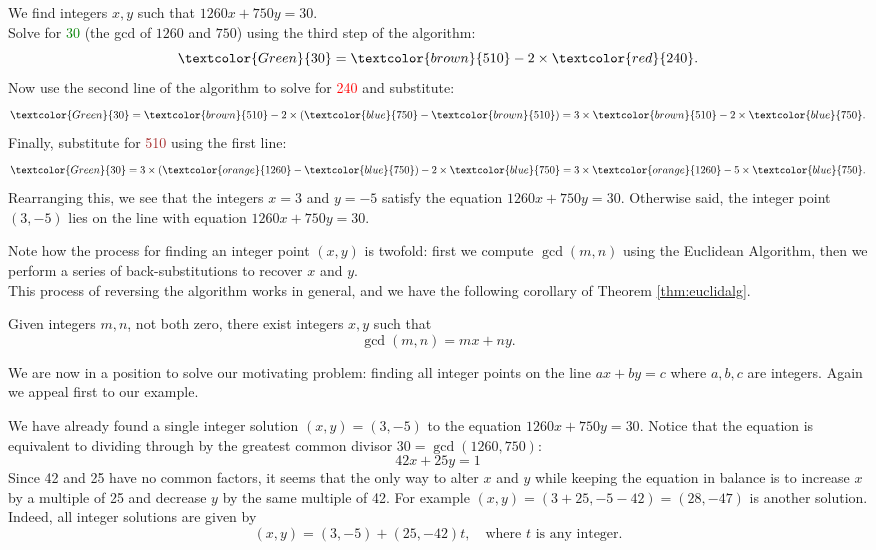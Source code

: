 \begin{example}[continued]
We find integers $x,y$ such that $1260x+750y=30$.\\[5pt]
Solve for \textcolor{Green}{30} (the gcd of $1260$ and $750$) using the third step of the algorithm:
\[\textcolor{Green}{30}=\textcolor{brown}{510}-2\times\textcolor{red}{240}.\]
Now use the second line of the algorithm to solve for \textcolor{red}{240} and substitute:
\[\textcolor{Green}{30}=\textcolor{brown}{510}-2\times (\textcolor{blue}{750}-\textcolor{brown}{510})=3\times \textcolor{brown}{510}-2\times \textcolor{blue}{750}.\]
Finally, substitute for \textcolor{brown}{510} using the first line:
\[\textcolor{Green}{30}=3\times (\textcolor{orange}{1260}-\textcolor{blue}{750})-2\times \textcolor{blue}{750}=3\times \textcolor{orange}{1260}-5\times \textcolor{blue}{750}.\]
Rearranging this, we see that the integers $x=3$ and $y=-5$ satisfy the equation $1260x+750y=30$. Otherwise said, the integer point $(3,-5)$ lies on the line with equation $1260x+750y=30$.
\end{example}

\noindent Note how the process for finding an integer point $(x,y)$ is twofold: first we compute $\gcd(m,n)$ using the Euclidean Algorithm, then we perform a series of back-substitutions to recover $x$ and $y$.\\

\noindent This process of reversing the algorithm works in general, and we have the following corollary of Theorem \ref{thm:euclidalg}.

\begin{cor}\label{cor:euclid}
Given integers $m,n$, not both zero, there exist integers $x,y$ such that
\[\gcd(m,n)=mx+ny.\]
\end{cor}

We are now in a position to solve our motivating problem: finding all integer points on the line $ax+by=c$ where $a,b,c$ are integers. Again we appeal first to our example.

\begin{example}
We have already found a single integer solution $(x,y)=(3,-5)$ to the equation $1260x+750y=30$. Notice that the equation is equivalent to dividing through by the greatest common divisor $30=\gcd(1260,750)$:
\[42x+25y=1\]
Since 42 and 25 have no common factors, it seems that the only way to alter $x$ and $y$ while keeping the equation in balance is to increase $x$ by a multiple of 25 and decrease $y$ by the same multiple of 42. For example $(x,y)=(3+25,-5-42)=(28,-47)$ is another solution. Indeed, all integer solutions are given by
\[(x,y)=(3,-5)+(25,-42)t,\quad\text{where $t$ is any integer.}\]
\end{example}


